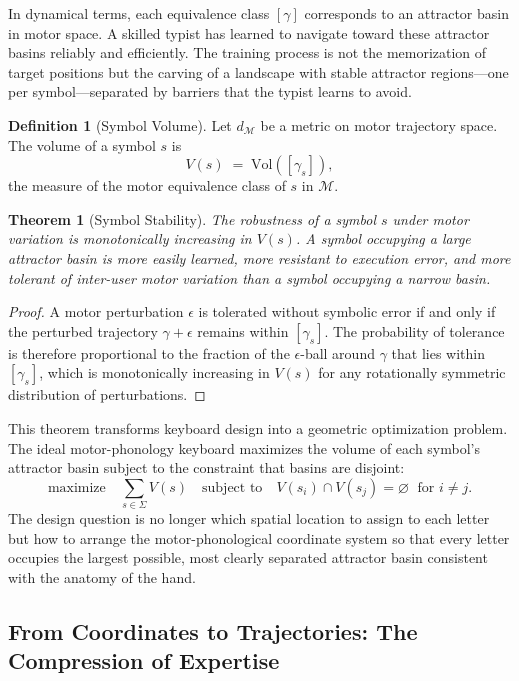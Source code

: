 \documentclass[12pt,a4paper]{article}
\theoremstyle{plain}
\newtheorem{theorem}{Theorem}
\theoremstyle{definition}
\newtheorem{definition}{Definition}
\theoremstyle{remark}
\begin{document}
In dynamical terms, each equivalence class $[\gamma]$ corresponds to an
attractor basin in motor space. A skilled typist has learned to navigate toward
these attractor basins reliably and efficiently. The training process is not the
memorization of target positions but the carving of a landscape with stable
attractor regions---one per symbol---separated by barriers that the typist
learns to avoid.

\begin{definition}[Symbol Volume]
Let $d_{\mathcal{M}}$ be a metric on motor trajectory space. The volume of a
symbol $s$ is
\[
  V(s) \;=\; \mathrm{Vol}([\gamma_s]),
\]
the measure of the motor equivalence class of $s$ in $\mathcal{M}$.
\end{definition}

\begin{theorem}[Symbol Stability]
The robustness of a symbol $s$ under motor variation is monotonically
increasing in $V(s)$. A symbol occupying a large attractor basin is more
easily learned, more resistant to execution error, and more tolerant of
inter-user motor variation than a symbol occupying a narrow basin.
\end{theorem}

\begin{proof}
A motor perturbation $\epsilon$ is tolerated without symbolic error if and only
if the perturbed trajectory $\gamma + \epsilon$ remains within $[\gamma_s]$.
The probability of tolerance is therefore proportional to the fraction of the
$\epsilon$-ball around $\gamma$ that lies within $[\gamma_s]$, which is
monotonically increasing in $V(s)$ for any rotationally symmetric distribution
of perturbations.
\end{proof}

This theorem transforms keyboard design into a geometric optimization problem.
The ideal motor-phonology keyboard maximizes the volume of each symbol's
attractor basin subject to the constraint that basins are disjoint:
\[
  \text{maximize} \quad \sum_{s \in \Sigma} V(s)
  \quad\text{subject to}\quad
  V(s_i) \cap V(s_j) = \varnothing \;\text{ for } i \neq j.
\]
The design question is no longer which spatial location to assign to each letter
but how to arrange the motor-phonological coordinate system so that every letter
occupies the largest possible, most clearly separated attractor basin consistent
with the anatomy of the hand.

\subsection{From Coordinates to Trajectories: The Compression of Expertise}
\end{document}

